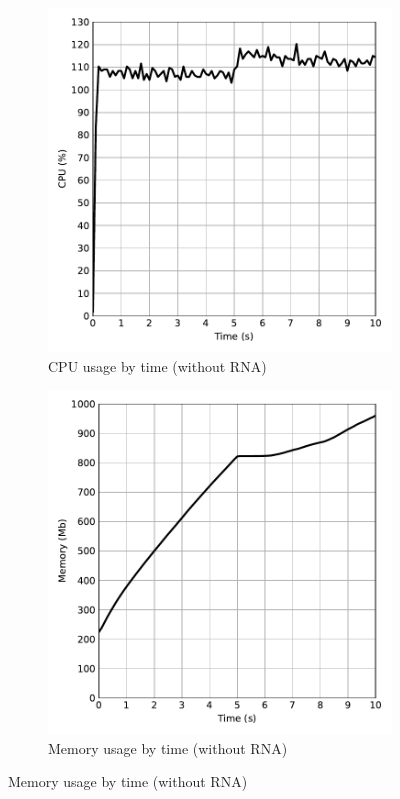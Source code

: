 \begin{figure}[htb]
    \caption{Performance evaluation without RNA}
    \begin{subfigure}{.5\textwidth}
        \centering
        \vspace{1em}
        \caption{CPU usage by time (without RNA)}
        \includegraphics[width=1.0\textwidth]{images/cpu_without_rna.pdf}
    \end{subfigure}%
    \begin{subfigure}{.5\textwidth}
        \centering
        \vspace{1em}
        \caption{Memory usage by time (without RNA)}
        \includegraphics[width=1.0\textwidth]{images/memory_without_rna.pdf}
    \end{subfigure}
    \label{fig:perf_without_rna}
\end{figure}

% 
% 

